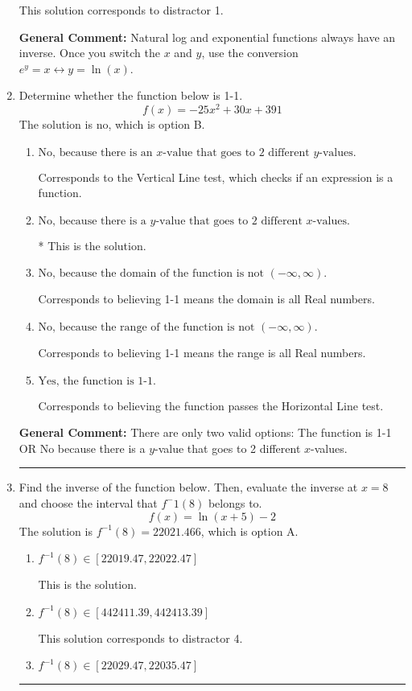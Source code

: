 \documentclass{extbook}[14pt]
\newcommand{\litem}[1]{\item #1

\rule{\textwidth}{0.4pt}}
\begin{document}
\begin{enumerate}
{\begin{enumerate}[label=\Alph*.]
 This solution corresponds to distractor 1.
\end{enumerate}

\textbf{General Comment:} Natural log and exponential functions always have an inverse. Once you switch the $x$ and $y$, use the conversion $ e^y = x \leftrightarrow y=\ln(x)$.
}
\litem{
Determine whether the function below is 1-1.
\[ f(x) = -25 x^2 + 30 x + 391 \]The solution is \( \text{no} \), which is option B.\begin{enumerate}[label=\Alph*.]
\item \( \text{No, because there is an $x$-value that goes to 2 different $y$-values.} \)

Corresponds to the Vertical Line test, which checks if an expression is a function.
\item \( \text{No, because there is a $y$-value that goes to 2 different $x$-values.} \)

* This is the solution.
\item \( \text{No, because the domain of the function is not $(-\infty, \infty)$.} \)

Corresponds to believing 1-1 means the domain is all Real numbers.
\item \( \text{No, because the range of the function is not $(-\infty, \infty)$.} \)

Corresponds to believing 1-1 means the range is all Real numbers.
\item \( \text{Yes, the function is 1-1.} \)

Corresponds to believing the function passes the Horizontal Line test.
\end{enumerate}

\textbf{General Comment:} There are only two valid options: The function is 1-1 OR No because there is a $y$-value that goes to 2 different $x$-values.
}
\litem{
Find the inverse of the function below. Then, evaluate the inverse at $x = 8$ and choose the interval that $f^-1(8)$ belongs to.
\[ f(x) = \ln{(x+5)}-2 \]The solution is \( f^{-1}(8) = 22021.466 \), which is option A.\begin{enumerate}[label=\Alph*.]
\item \( f^{-1}(8) \in [22019.47, 22022.47] \)

 This is the solution.
\item \( f^{-1}(8) \in [442411.39, 442413.39] \)

 This solution corresponds to distractor 4.
\item \( f^{-1}(8) \in [22029.47, 22035.47] \)


\end{enumerate}}
\end{enumerate}
\end{document}
